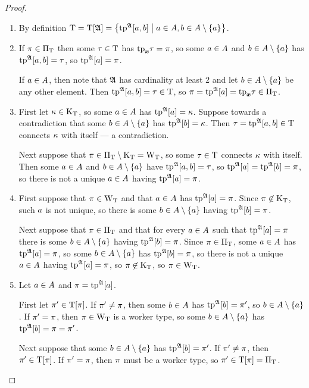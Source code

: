 \begin{proof}

\begin{enumerate}
  \item
  By definition $\mathrm{T} = \mathrm{T}[\mathfrak{A}] =
  \left\{\operatorname{tp}^{\mathfrak{A}}[a,b]\mathrel{}\middle|\mathrel{}a\in A,b\in A\setminus\left\{a\right\}\right\}$.
  
  \item
  If $\pi\in{\Pi}_{\mathrm{T}}$ then some $\tau\in\mathrm{T}$ has $\mathrm{tp}_{\bm{x}}\tau = \pi$,
  so some $a\in A$ and $b\in A\setminus\left\{a\right\}$ has
  $\operatorname{tp}^{\mathfrak{A}}[a,b] = \tau$, so $\operatorname{tp}^{\mathfrak{A}}[a] = \pi$.
  
  If $a\in A$, then note that $\mathfrak{A}$ has cardinality at least $2$
  and let $b\in A\setminus\left\{a\right\}$ be any other element.
  Then $\operatorname{tp}^{\mathfrak{A}}[a,b] = \tau \in \mathrm{T}$,
  so $\pi = \operatorname{tp}^{\mathfrak{A}}[a] = \mathrm{tp}_{\bm{x}}\tau \in {\Pi}_{\mathrm{T}}$.
  
  \item
  First let $\kappa\in{\mathrm{K}}_{\mathrm{T}}$, so some $a\in A$ has $\operatorname{tp}^{\mathfrak{A}}[a] = \kappa$.
  Suppose towards a contradiction that
  some $b\in A\setminus\left\{a\right\}$ has $\operatorname{tp}^{\mathfrak{A}}[b] = \kappa$.
  Then $\tau = \operatorname{tp}^{\mathfrak{A}}[a,b] \in \mathrm{T}$ connects $\kappa$ with itself
  --- a contradiction.
  
  Next suppose that $\pi\in{\Pi}_{\mathrm{T}}\setminus{\mathrm{K}}_{\mathrm{T}} = {\mathrm{W}}_{\mathrm{T}}$,
  so some $\tau\in\mathrm{T}$ connects $\kappa$ with itself.
  Then some $a\in A$ and $b\in A\setminus\left\{a\right\}$
  have $\operatorname{tp}^{\mathfrak{A}}[a,b] = \tau$,
  so $\operatorname{tp}^{\mathfrak{A}}[a] = \operatorname{tp}^{\mathfrak{A}}[b] = \pi$,
  so there is not a unique $a\in A$ having $\operatorname{tp}^{\mathfrak{A}}[a] = \pi$.
  
  \item
  First suppose that $\pi\in{\mathrm{W}}_{\mathrm{T}}$ and that $a\in A$
  has $\operatorname{tp}^{\mathfrak{A}}[a] = \pi$.
  Since $\pi\not\in{\mathrm{K}}_{\mathrm{T}}$, such $a$ is not unique, so there is some
  $b\in A\setminus\left\{a\right\}$ having $\operatorname{tp}^{\mathfrak{A}}[b] = \pi$.
  
  Next suppose that $\pi\in{\Pi}_{\mathrm{T}}$ and that for every $a\in A$ such that
  $\operatorname{tp}^{\mathfrak{A}}[a] = \pi$ there is some $b\in A\setminus\left\{a\right\}$ having
  $\operatorname{tp}^{\mathfrak{A}}[b] = \pi$.
  Since $\pi\in{\Pi}_{\mathrm{T}}$, some $a\in A$ has $\operatorname{tp}^{\mathfrak{A}}[a] = \pi$, so some
  $b\in A\setminus\left\{a\right\}$ has $\operatorname{tp}^{\mathfrak{A}}[b] = \pi$, so there is not a unique
  $a\in A$ having $\operatorname{tp}^{\mathfrak{A}}[a] = \pi$, so $\pi\not\in{\mathrm{K}}_{\mathrm{T}}$, so
  $\pi\in{\mathrm{W}}_{\mathrm{T}}$.
  \item
  Let $a\in A$ and $\pi = \operatorname{tp}^{\mathfrak{A}}[a]$.
  
  First let ${\pi'}\in\mathrm{T}[\pi]$.
  If ${\pi'} \neq \pi$, then some $b \in A$ has
  $\operatorname{tp}^{\mathfrak{A}}[b] = {\pi'}$, so $b \in A\setminus\left\{a\right\}$.
  If ${\pi'} = \pi$, then $\pi \in {\mathrm{W}}_{\mathrm{T}}$ is a worker type,
  so some $b\in A\setminus\left\{a\right\}$ has
  $\operatorname{tp}^{\mathfrak{A}}[b] = \pi = {\pi'}$.
  
  Next suppose that some $b\in A\setminus\left\{a\right\}$ has $\operatorname{tp}^{\mathfrak{A}}[b] = {\pi'}$.
  If ${\pi'} \neq \pi$, then ${\pi'} \in \mathrm{T}[\pi]$.
  If ${\pi'} = \pi$, then $\pi$ must be a worker type,
  so ${\pi'} \in \mathrm{T}[\pi] = {\Pi}_{\mathrm{T}}$.
\end{enumerate}
\end{proof}

